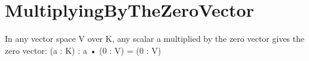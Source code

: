 \section{MultiplyingByTheZeroVector}

\begin{theorem}
  \label{theorem : smul_zero_v}
  \leanok
  In any vector space V over K, any scalar a multiplied by the zero vector gives the zero vector: (a : K) : a • (0 : V) = (0 : V)
\end{theorem}